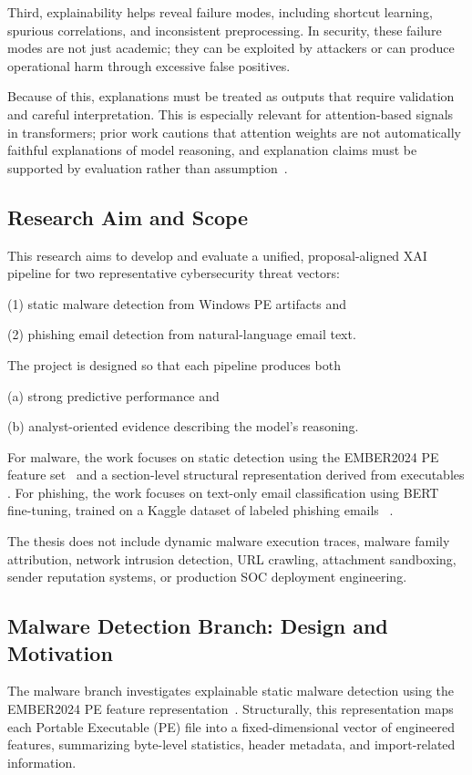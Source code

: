 \documentclass[conference]{IEEEtran}
\begin{document}
Third, explainability helps reveal failure modes, including shortcut learning, spurious correlations, and inconsistent preprocessing. In security, these failure modes are not just academic; they can be exploited by attackers or can produce operational harm through excessive false positives.

Because of this, explanations must be treated as outputs that require validation and careful interpretation. This is especially relevant for attention-based signals in transformers; prior work cautions that attention weights are not automatically faithful explanations of model reasoning, and explanation claims must be supported by evaluation rather than assumption~\cite{JW2019}.

\subsection{Research Aim and Scope}

This research aims to develop and evaluate a unified, proposal-aligned XAI pipeline for two representative cybersecurity threat vectors:

(1) static malware detection from Windows PE artifacts and

(2) phishing email detection from natural-language email text.

The project is designed so that each pipeline produces both

(a) strong predictive performance and

(b) analyst-oriented evidence describing the model’s reasoning.

For malware, the work focuses on static detection using the EMBER2024 PE feature set~\cite{JMGPR2024} and a section-level structural representation derived from executables . For phishing, the work focuses on text-only email classification using BERT fine-tuning, trained on a Kaggle dataset of labeled phishing emails~\cite{JMKK2019} \cite{phishingDT}.

The thesis does not include dynamic malware execution traces, malware family attribution, network intrusion detection, URL crawling, attachment sandboxing, sender reputation systems, or production SOC deployment engineering.

\subsection{Malware Detection Branch: Design and Motivation}

The malware branch investigates explainable static malware detection using the EMBER2024 PE feature representation~\cite{JMGPR2024}. Structurally, this representation maps each Portable Executable (PE) file into a fixed-dimensional vector of engineered features, summarizing byte-level statistics, header metadata, and import-related information.
\end{document}
